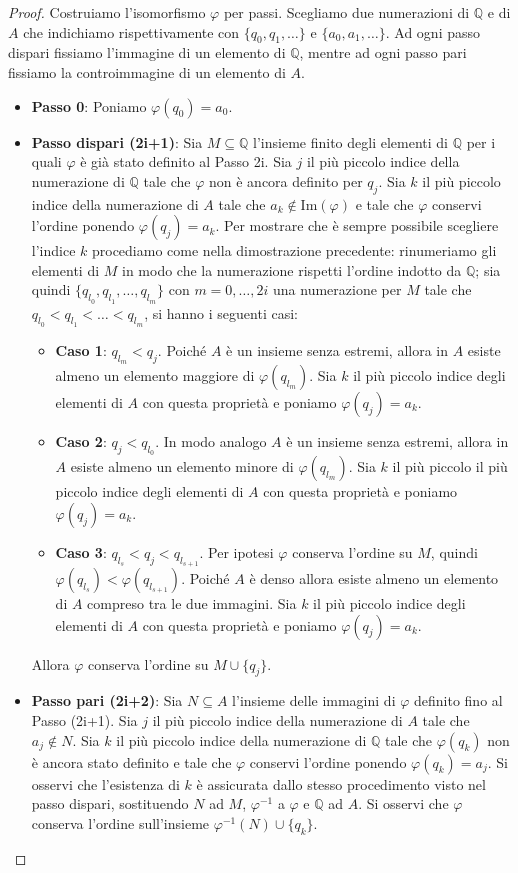\documentclass[12pt,a4paper,openright]{report}
\newcommand{\Q}{\mathbb{Q}} %
\newcommand{\0}{\setminus\{0\}} %
\theoremstyle{definition}
\theoremstyle{plain}
\begin{document}
\begin{proof}
Costruiamo l'isomorfismo $\varphi$ per passi. Scegliamo due numerazioni di $\Q$ e di $A$ che indichiamo rispettivamente con $\{q_0,q_1,\ldots \}$ e $\{a_0,a_1,\ldots\}$.
Ad ogni passo dispari fissiamo l'immagine di un elemento di $\Q$, mentre ad ogni passo pari fissiamo la controimmagine di un elemento di $A$.
\begin{itemize}
    \item[] \textbf{Passo 0}: Poniamo $\varphi(q_0)=a_0$.
    \item[] \textbf{Passo dispari (2i+1)}: Sia $M \subseteq \Q$ l'insieme finito degli elementi di $\Q$ per i quali $\varphi$ è già stato definito al Passo 2i. Sia $j$ il più piccolo indice della numerazione di $\Q$ tale che $\varphi$ non è ancora definito per $q_j$. Sia $k$ il più piccolo indice della numerazione di $A$ tale che $a_k \notin \mathrm{Im}(\varphi)$ e tale che $\varphi$ conservi l'ordine ponendo $\varphi(q_j)=a_k$. Per mostrare che è sempre possibile scegliere l'indice $k$ procediamo come nella dimostrazione precedente: rinumeriamo gli elementi di $M$ in modo che la numerazione rispetti l'ordine indotto da $\Q$; sia quindi  $\{q_{l_0},q_{l_1},\ldots,q_{l_{m}}\}$ con $m=0,\ldots,2i$ una numerazione per $M$ tale che $q_{l_0}<q_{l_1}<\ldots<q_{l_{m}}$, si hanno i seguenti casi: 
    \begin{itemize}
        \item[] \textbf{Caso 1}: $q_{l_{m}}<q_{j}$. Poiché $A$ è un insieme senza estremi, allora in $A$ esiste almeno un elemento maggiore di $\varphi(q_{l_m})$. Sia $k$ il più piccolo indice degli elementi di $A$ con questa proprietà e poniamo $\varphi(q_j)=a_k$.
        \item[] \textbf{Caso 2}: $q_j<q_{l_0}$. In modo analogo $A$ è un insieme senza estremi, allora in $A$ esiste almeno un elemento minore di $\varphi(q_{l_m})$. Sia $k$ il più piccolo il più piccolo indice degli elementi di $A$ con questa proprietà e poniamo $\varphi(q_j)=a_k$.
        \item[] \textbf{Caso 3}: $q_{l_s}<q_{j}<q_{l_{s+1}}$. Per ipotesi $\varphi$ conserva l'ordine su $M$, quindi $\varphi(q_{l_s})<\varphi(q_{l_{s+1}})$. Poiché $A$ è denso allora esiste almeno un elemento di $A$ compreso tra le due immagini. Sia $k$ il più piccolo indice degli elementi di $A$ con questa proprietà e poniamo $\varphi(q_{j})=a_k$.
    \end{itemize}
    Allora $\varphi$ conserva l'ordine su $M \cup \{q_j\}$. 
    \item[] \textbf{Passo pari (2i+2)}: Sia $N \subseteq A$ l'insieme delle immagini di $\varphi$ definito fino al Passo (2i+1). Sia $j$ il più piccolo indice della numerazione di $A$ tale che $a_j \notin N$. Sia $k$ il più piccolo indice della numerazione di $\Q$ tale che $\varphi(q_k)$ non è ancora stato definito e tale che $\varphi$ conservi l'ordine ponendo $\varphi(q_k)=a_j$. Si osservi che l'esistenza di $k$ è assicurata dallo stesso procedimento visto nel passo dispari, sostituendo $N$ ad $M$, $\varphi^{-1}$ a $\varphi$ e $\Q$ ad $A$. Si osservi che $\varphi$ conserva l'ordine sull'insieme $\varphi^{-1}(N) \cup \{q_k\}$.
\end{itemize}


\end{proof}
\end{document}
